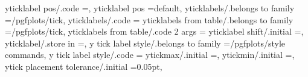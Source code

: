 {{{{{{{{{{{{{yticklabel pos/.code                                               ={},                                                                                            
yticklabel pos                                                     =default,                                                                                                                           
yticklabels/.belongs to family                                     =/pgfplots/tick,                                                                                                                    
yticklabels/.code                                                  ={%
yticklabels from table/.belongs to family                          =/pgfplots/tick,                                                                                                                    
yticklabels from table/.code 2 args                                ={%
yticklabel shift/.initial                                          =,                                                                                                                                  
yticklabel/.store in                                               =\pgfplots@yticklabel,                                                                                                              
y tick label style/.belongs to family                              =/pgfplots/style commands,                                                                                                          
y tick label style/.code                                           ={%
ytickmax/.initial                                                  =,                                                                                                                                  
ytickmin/.initial                                                  =,                                                                                                                                  
ytick placement tolerance/.initial                                 =0.05pt,                                                                                                                            
}}}}}}}}}}}}}}}}
